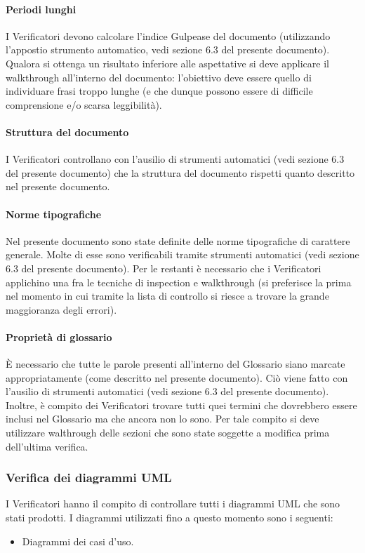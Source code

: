 			\paragraph{Periodi lunghi}
				I Verificatori devono calcolare l'indice Gulpease del documento (utilizzando l'appostio strumento automatico, vedi sezione 6.3 del presente documento). Qualora si ottenga un 
				risultato inferiore alle aspettative si deve applicare il walkthrough all'interno del documento: l'obiettivo deve essere quello di 
				individuare frasi troppo lunghe (e che dunque possono essere di difficile comprensione e/o scarsa leggibilità).
			\paragraph{Struttura del documento}
				I Verificatori controllano con l'ausilio di strumenti automatici (vedi sezione 6.3 del presente documento) che la struttura del documento rispetti quanto descritto nel presente 
				documento.
			\paragraph{Norme tipografiche}
				Nel presente documento sono state definite delle norme tipografiche di carattere generale. Molte di esse sono verificabili tramite 
				strumenti automatici (vedi sezione 6.3 del presente documento). Per le restanti è necessario che i Verificatori applichino una fra le tecniche di inspection e walkthrough 
				(si preferisce la prima nel momento in cui tramite la lista di controllo si riesce a trovare la grande maggioranza degli errori).
			\paragraph{Proprietà di glossario}
				È necessario che tutte le parole presenti all'interno del Glossario siano marcate appropriatamente (come descritto nel presente 
				documento). Ciò viene fatto con l'ausilio di strumenti automatici (vedi sezione 6.3 del presente documento). Inoltre, è compito dei Verificatori trovare tutti quei termini che 
				dovrebbero essere inclusi nel Glossario ma che ancora non lo sono. Per tale compito si deve utilizzare walthrough delle sezioni che sono 
				state soggette a modifica prima dell'ultima verifica.
		\subsubsection{Verifica dei diagrammi UML}
			I Verificatori hanno il compito di controllare tutti i diagrammi UML che sono stati prodotti. I diagrammi utilizzati fino a questo momento 
			sono i seguenti:
			\begin{itemize}
				\item Diagrammi dei casi d'uso.
			\end{itemize}
